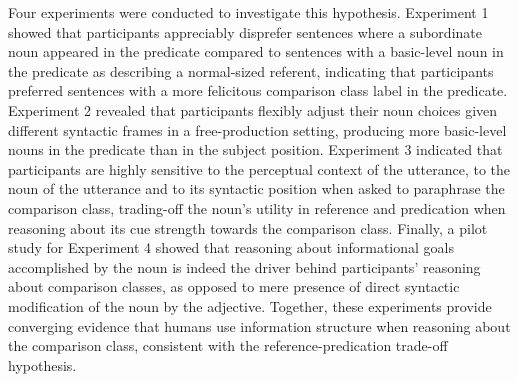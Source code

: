 Four experiments were conducted to investigate this hypothesis. Experiment 1 showed that participants appreciably disprefer sentences where a subordinate noun appeared in the predicate compared to sentences with a basic-level noun in the predicate as describing a normal-sized referent, indicating that participants preferred sentences with a more felicitous comparison class label in the predicate. Experiment 2 revealed that participants flexibly adjust their noun choices given different syntactic frames in a free-production setting, producing more basic-level nouns in the predicate than in the subject position. Experiment 3 indicated that participants are highly sensitive to the perceptual context of the utterance, to the noun of the utterance and to its syntactic position when asked to paraphrase the comparison class, trading-off the noun's utility in reference and predication when reasoning about its cue strength towards the comparison class. Finally, a pilot study for Experiment 4 showed that reasoning about informational goals accomplished by the noun is indeed the driver behind participants' reasoning about comparison classes, as opposed to mere presence of direct syntactic modification of the noun by the adjective. %
Together, these experiments provide converging evidence that humans use information structure when reasoning about the comparison class, consistent with the reference-predication trade-off hypothesis. 


